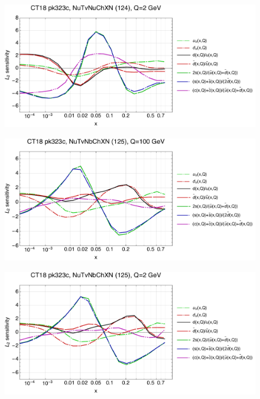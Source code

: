 \documentclass[10pt,aps,prd,floatfix,titlepage]{revtex4}
\begin{document}
\begin{figure}
\includegraphics[width=\textwidth,height=0.44\textheight,keepaspectratio]{2/124_ct18nn_q2_Sf_2.pdf}
\caption{}
\end{figure}
\clearpage
\begin{figure}
\includegraphics[width=\textwidth,height=0.44\textheight,keepaspectratio]{2/125_ct18nn_q100_Sf_2.pdf}
\caption{}
\end{figure}
\begin{figure}
\includegraphics[width=\textwidth,height=0.44\textheight,keepaspectratio]{2/125_ct18nn_q2_Sf_2.pdf}
\caption{}
\end{figure}
\end{document}
